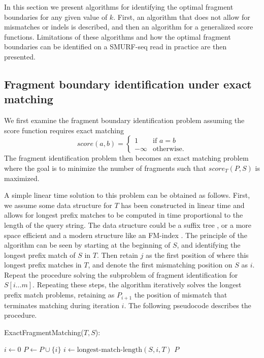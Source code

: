 %
In this section we present algorithms for identifying the optimal
fragment boundaries for any given value of $k$. First, an algorithm that
does not allow for mismatches or indels is described, and then an
algorithm for a generalized score functions. Limitations of these
algorithms and how the optimal fragment boundaries can be identified on
a SMURF-seq read in practice are then presented.

\subsection{Fragment boundary identification under exact matching}
We first examine the fragment boundary identification problem assuming
the score function requires exact matching
\[score(a,b)=
\begin{cases}
  1 & \text{if } a = b \\
  -\infty & \text{otherwise.}
\end{cases}\]
The fragment identification problem then becomes an exact matching
problem where the goal is to minimize the number of fragments such that
$score_T(P,S)$ is maximized.

A simple linear time solution to this problem can be obtained as
follows. First, we assume some data structure for $T$ has been
constructed in linear time and allows for longest prefix matches to be
computed in time proportional to the length of the query string. The
data structure could be a suffix tree \citep{mccreight1976space}, or a
more space efficient and a modern structure like an FM-index
\citep{ferragina2000opportunistic}. The principle of the algorithm can be
seen by starting at the beginning of $S$, and identifying the longest
prefix match of $S$ in $T$. Then retain $j$ as the first position of
where this longest prefix matches in $T$, and denote the first
mismatching position on $S$ as $i$. Repeat the procedure solving the
subproblem of fragment identification for $S[i\dots m]$. Repeating these
steps, the algorithm iteratively solves the longest prefix match
problems, retaining as $P_{i+1}$ the position of mismatch that
terminates matching during iteration $i$. The following pseudocode
describes the procedure.

\begin{algorithm}[H]
\caption{ExactFragmentMatching($T, S$):}
\begin{algorithmic}[1]
  \STATE $i \leftarrow 0$
    \STATE $P \leftarrow P\cup \{i\}$
    \STATE $i \leftarrow \text{longest-match-length}(S,i,T)$
  \ENDWHILE
  \RETURN $P$
\end{algorithmic}
\end{algorithm}


